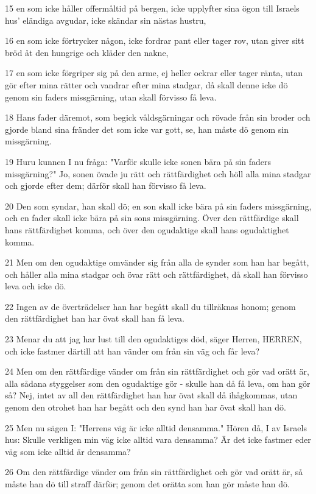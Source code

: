 \par 15 en som icke håller offermåltid på bergen, icke upplyfter sina ögon till Israels hus' eländiga avgudar, icke skändar sin nästas hustru,
\par 16 en som icke förtrycker någon, icke fordrar pant eller tager rov, utan giver sitt bröd åt den hungrige och kläder den nakne,
\par 17 en som icke förgriper sig på den arme, ej heller ockrar eller tager ränta, utan gör efter mina rätter och vandrar efter mina stadgar, då skall denne icke dö genom sin faders missgärning, utan skall förvisso få leva.
\par 18 Hans fader däremot, som begick våldsgärningar och rövade från sin broder och gjorde bland sina fränder det som icke var gott, se, han måste dö genom sin missgärning.
\par 19 Huru kunnen I nu fråga: "Varför skulle icke sonen bära på sin faders missgärning?" Jo, sonen övade ju rätt och rättfärdighet och höll alla mina stadgar och gjorde efter dem; därför skall han förvisso få leva.
\par 20 Den som syndar, han skall dö; en son skall icke bära på sin faders missgärning, och en fader skall icke bära på sin sons missgärning. Över den rättfärdige skall hans rättfärdighet komma, och över den ogudaktige skall hans ogudaktighet komma.
\par 21 Men om den ogudaktige omvänder sig från alla de synder som han har begått, och håller alla mina stadgar och övar rätt och rättfärdighet, då skall han förvisso leva och icke dö.
\par 22 Ingen av de överträdelser han har begått skall du tillräknas honom; genom den rättfärdighet han har övat skall han få leva.
\par 23 Menar du att jag har lust till den ogudaktiges död, säger Herren, HERREN, och icke fastmer därtill att han vänder om från sin väg och får leva?
\par 24 Men om den rättfärdige vänder om från sin rättfärdighet och gör vad orätt är, alla sådana styggelser som den ogudaktige gör - skulle han då få leva, om han gör så? Nej, intet av all den rättfärdighet han har övat skall då ihågkommas, utan genom den otrohet han har begått och den synd han har övat skall han dö.
\par 25 Men nu sägen I: "Herrens väg är icke alltid densamma." Hören då, I av Israels hus: Skulle verkligen min väg icke alltid vara densamma? Är det icke fastmer eder väg som icke alltid är densamma?
\par 26 Om den rättfärdige vänder om från sin rättfärdighet och gör vad orätt är, så måste han dö till straff därför; genom det orätta som han gör måste han dö.
